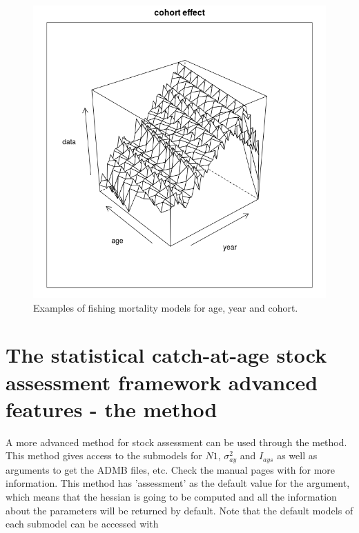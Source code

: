\documentclass[a4paper,english,10pt]{article}\usepackage[]{graphicx}\usepackage[]{color}
\makeatletter
\def\maxwidth{ %
  \ifdim\Gin@nat@width>\linewidth
    \linewidth
  \else
    \Gin@nat@width
  \fi
}
\newenvironment{knitrout}{}{} %
\makeatother
\begin{document}
\begin{knitrout}
\begin{figure}[H]
{\centering \includegraphics[width=\maxwidth]{figure/majeff-3} 

}

\caption[Examples of fishing mortality models for age, year and cohort]{Examples of fishing mortality models for age, year and cohort.}\label{fig:majeff3}
\end{figure}


\end{knitrout}

\section{The statistical catch-at-age stock assessment framework advanced features - the  method}

A more advanced method for stock assessment can be used through the  method. This method gives access to the submodels for $N1$, $\sigma^2_{ay}$ and $I_{ays}$ as well as arguments to get the ADMB files, etc. Check the manual pages with  for more information. This method has 'assessment' as the default value for the  argument, which means that the hessian is going to be computed and all the information about the parameters will be returned by default. Note that the default models of each submodel can be accessed with
\end{document}
